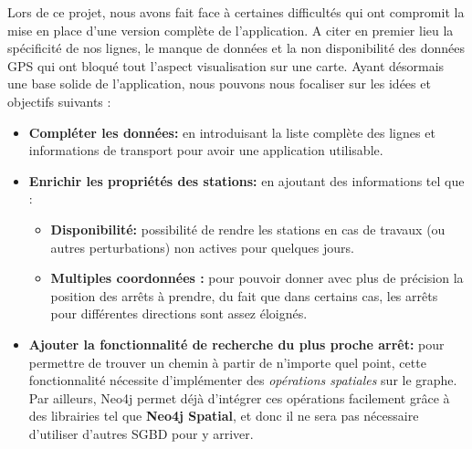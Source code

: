 Lors de ce projet, nous avons fait face à certaines difficultés qui ont compromit la mise en place d'une version complète de l'application. A citer en premier lieu la spécificité de nos lignes, le manque de données et la non disponibilité des données GPS qui ont bloqué tout l'aspect visualisation sur une carte.\newline\newline
Ayant désormais une base solide de l'application, nous pouvons nous focaliser sur les idées et objectifs suivants :
\begin{itemize}
	\item \textbf{Compléter les données:} en introduisant la liste complète des lignes et informations de transport pour avoir une application utilisable.
	
	\item \textbf{Enrichir les propriétés des stations: }en ajoutant des informations tel que :
		\begin{itemize}
			\item \textbf{Disponibilité:} possibilité de rendre les stations en cas de travaux (ou autres perturbations) non actives pour quelques jours.
			\item \textbf{Multiples coordonnées :} pour pouvoir donner avec plus de précision la position des arrêts à prendre, du fait que dans certains cas, les arrêts pour différentes directions sont assez éloignés.
		\end{itemize}
		
	\item \textbf{Ajouter la fonctionnalité de recherche du plus proche arrêt: } pour permettre de trouver un chemin à partir de n'importe quel point, cette fonctionnalité nécessite d'implémenter des \emph{opérations spatiales} sur le graphe. Par ailleurs, Neo4j permet déjà d'intégrer ces opérations facilement grâce à des librairies tel que \textbf{Neo4j Spatial}, et donc il ne sera pas nécessaire d'utiliser d'autres SGBD pour y arriver.


\end{itemize}
